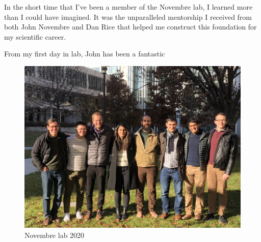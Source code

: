 \acknowledgments

In the short time that I've been a member of the Novembre lab, I learned more than I could have imagined. It was the unparalleled mentorship I received from both John Novembre and Dan Rice that helped me construct this foundation for my scientific career.

From my first day in lab, John has been a fantastic 

 
\begin{figure}[h]
    \centering
    \includegraphics[scale=0.075]{img/IMG_1361.jpg}
    \caption{Novembre lab 2020}
    \label{fig:lab_photo}
\end{figure}
